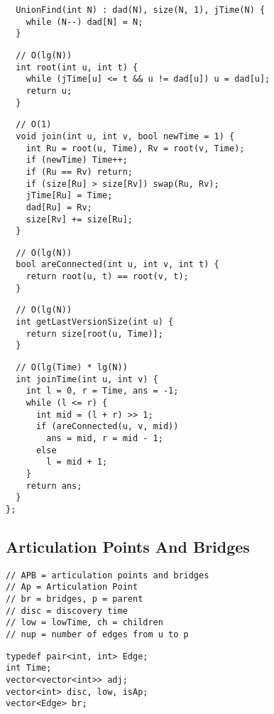 \documentclass[twoside]{article}
\newcommand{\fileTitleStyle}{\large\underline}
\begin{document}
\begin{multicols*}{2}
\begin{verbatim}
  UnionFind(int N) : dad(N), size(N, 1), jTime(N) {
    while (N--) dad[N] = N;
  }
\end{verbatim}
\vspace{-12pt}
\begin{verbatim}
  // O(lg(N))
  int root(int u, int t) {
    while (jTime[u] <= t && u != dad[u]) u = dad[u];
    return u;
  }
\end{verbatim}
\vspace{-12pt}
\begin{verbatim}
  // O(1)
  void join(int u, int v, bool newTime = 1) {
    int Ru = root(u, Time), Rv = root(v, Time);
    if (newTime) Time++;
    if (Ru == Rv) return;
    if (size[Ru] > size[Rv]) swap(Ru, Rv);
    jTime[Ru] = Time;
    dad[Ru] = Rv;
    size[Rv] += size[Ru];
  }
\end{verbatim}
\vspace{-12pt}
\begin{verbatim}
  // O(lg(N))
  bool areConnected(int u, int v, int t) {
    return root(u, t) == root(v, t);
  }
\end{verbatim}
\vspace{-12pt}
\begin{verbatim}
  // O(lg(N))
  int getLastVersionSize(int u) {
    return size[root(u, Time)];
  }
\end{verbatim}
\vspace{-12pt}
\begin{verbatim}
  // O(lg(Time) * lg(N))
  int joinTime(int u, int v) {
    int l = 0, r = Time, ans = -1;
    while (l <= r) {
      int mid = (l + r) >> 1;
      if (areConnected(u, v, mid))
        ans = mid, r = mid - 1;
      else
        l = mid + 1;
    }
    return ans;
  }
};
\end{verbatim}

\subsectionfont{\centering\bfseries\LARGE}
\subsectionfont{\fileTitleStyle}
\subsection*{Articulation Points And Bridges}
\begin{verbatim}
// APB = articulation points and bridges
// Ap = Articulation Point
// br = bridges, p = parent
// disc = discovery time
// low = lowTime, ch = children
// nup = number of edges from u to p
\end{verbatim}
\vspace{-12pt}
\begin{verbatim}
typedef pair<int, int> Edge;
int Time;
vector<vector<int>> adj;
vector<int> disc, low, isAp;
vector<Edge> br;


\end{verbatim}
\end{multicols*}
\end{document}
